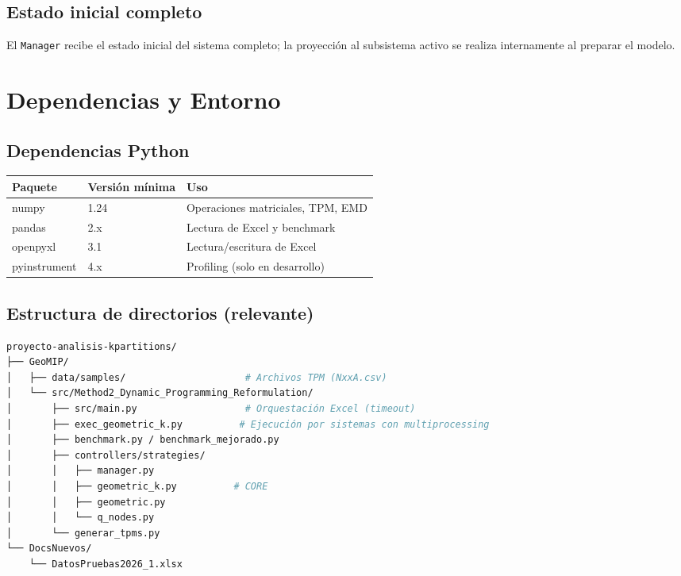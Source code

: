 \documentclass[12pt,a4paper]{article}
\begin{document}
\subsection{Estado inicial completo}
El \texttt{Manager} recibe el estado inicial del sistema completo; la proyección al subsistema activo se realiza internamente al preparar el modelo.

\section{Dependencias y Entorno}

\subsection{Dependencias Python}
\begin{longtable}{lll}
    \toprule
    Paquete & Versión mínima & Uso \\
    \midrule
    \endhead
    numpy   & 1.24 & Operaciones matriciales, TPM, EMD \\
    pandas   & 2.x & Lectura de Excel y benchmark \\
    openpyxl & 3.1 & Lectura/escritura de Excel \\
    pyinstrument & 4.x & Profiling (solo en desarrollo) \\
    \bottomrule
\end{longtable}

\subsection{Estructura de directorios (relevante)}
\begin{lstlisting}[language=bash, caption={Estructura del repositorio}]
proyecto-analisis-kpartitions/
├── GeoMIP/
│   ├── data/samples/                     # Archivos TPM (NxxA.csv)
│   └── src/Method2_Dynamic_Programming_Reformulation/
│       ├── src/main.py                   # Orquestación Excel (timeout)
│       ├── exec_geometric_k.py          # Ejecución por sistemas con multiprocessing
│       ├── benchmark.py / benchmark_mejorado.py
│       ├── controllers/strategies/
│       │   ├── manager.py
│       │   ├── geometric_k.py          # CORE
│       │   ├── geometric.py
│       │   └── q_nodes.py
│       └── generar_tpms.py
└── DocsNuevos/
    └── DatosPruebas2026_1.xlsx
\end{lstlisting}
\end{document}
